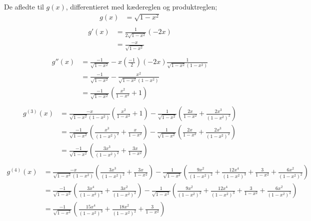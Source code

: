 De afledte til $g(x)$, differentieret med kædereglen og produktreglen;
\begin{align*}
g(x) &= \sqrt{1-x^2} \\
\end{align*}
\begin{align*}
g'(x) &= \frac{1}{2\sqrt{1-x^2}} (-2x)\\
&= \frac{-x}{\sqrt{1-x^2}} \\
\end{align*}
\begin{align*}
g''(x) &= \frac{-1}{\sqrt{1-x^2}} -x\left(\frac{-1}{2}\right)(-2x)\frac{1}{\sqrt{1-x^2}(1-x^2)}\\
&= \frac{-1}{\sqrt{1-x^2}} -\frac{x^2}{\sqrt{1-x^2}(1-x^2)}\\
&= \frac{-1}{\sqrt{1-x^2}}\left(\frac{x^2}{1-x^2}+1\right)\\
\end{align*}
\begin{align*}
g^{(3)}(x) &= \frac{-x}{\sqrt{1-x^2}(1-x^2)}\left(\frac{x^2}{1-x^2}+1\right)- \frac{1}{\sqrt{1-x^2}}\left(\frac{2x}{1-x^2}+\frac{2x^3}{(1-x^2)^2}\right)\\
&= \frac{-1}{\sqrt{1-x^2}}\left(\frac{x^3}{(1-x^2)^2}+\frac{x}{1-x^2}\right)- \frac{1}{\sqrt{1-x^2}}\left(\frac{2x}{1-x^2}+\frac{2x^3}{(1-x^2)^2}\right)\\
&=\frac{-1}{\sqrt{1-x^2}}\left(\frac{3x^3}{(1-x^2)^2}+\frac{3x}{1-x^2}\right) \\
\end{align*}
\begin{align*}
g^{(4)}(x) &= \frac{-x}{\sqrt{1-x^2}(1-x^2)}\left(\frac{3x^3}{(1-x^2)^2}+\frac{3x}{1-x^2}\right)-\frac{1}{\sqrt{1-x^2}}\left(\frac{9x^2}{(1-x^2)^2}+\frac{12x^4}{(1-x^2)^3}+\frac{3}{1-x^2}+\frac{6x^2}{(1-x^2)^2}\right) \\
&= \frac{-1}{\sqrt{1-x^2}}\left(\frac{3x^4}{(1-x^2)^3}+\frac{3x^2}{(1-x^2)^2}\right)-\frac{1}{\sqrt{1-x^2}}\left(\frac{9x^2}{(1-x^2)^2}+\frac{12x^4}{(1-x^2)^3}+\frac{3}{1-x^2}+\frac{6x^2}{(1-x^2)^2}\right) \\
&= \frac{-1}{\sqrt{1-x^2}} \left(\frac{15x^4}{(1-x^2)^3}+\frac{18x^2}{(1-x^2)^2}+\frac{3}{1-x^2}\right)\\
\end{align*}